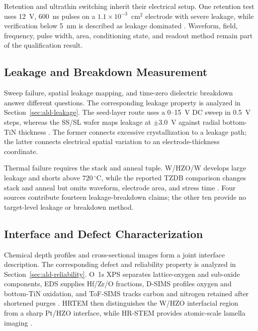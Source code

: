 \documentclass[11pt,a4paper]{report}
\begin{document}
Retention and ultrathin switching inherit their electrical setup. One retention test uses 12~V, 600~ns pulses on a $1.1\times10^{-3}$~cm$^2$ electrode with severe leakage, while verification below 5~nm is described as leakage dominated \cite{zhang2015inductive,mikolajick2018mrs}. Waveform, field, frequency, pulse width, area, conditioning state, and readout method remain part of the qualification result.

\subsection{Leakage and Breakdown Measurement}
\label{sec:ald-leakage-measurement}

Sweep failure, spatial leakage mapping, and time-zero dielectric breakdown answer different questions. The corresponding leakage property is analyzed in Section~\ref{sec:ald-leakage}. The seed-layer route uses a 0--15~V DC sweep in 0.5~V steps, whereas the SS/SL wafer maps leakage at $\pm3.0$~V against radial bottom-TiN thickness \cite{song2023seed,kaatranen2026unif}. The former connects excessive crystallization to a leakage path; the latter connects electrical spatial variation to an electrode-thickness coordinate.

Thermal failure requires the stack and anneal tuple. W/HZO/W develops large leakage and shorts above $720\,^{\circ}$C, while the reported TZDB comparison changes stack and anneal but omits waveform, electrode area, and stress time \cite{liu2025zrrich,kashir2021wake}. Four sources contribute fourteen leakage-breakdown claims; the other ten provide no target-level leakage or breakdown method.

\subsection{Interface and Defect Characterization}
\label{sec:ald-interface-defect-characterization}

Chemical depth profiles and cross-sectional images form a joint interface description. The corresponding defect and reliability property is analyzed in Section~\ref{sec:ald-reliability}. O~1s XPS separates lattice-oxygen and sub-oxide components, EDS supplies Hf/Zr/O fractions, D-SIMS profiles oxygen and bottom-TiN oxidation, and ToF-SIMS tracks carbon and nitrogen retained after shortened purges \cite{choi2022chamber,choi2025purge,kim2020tin}. HRTEM then distinguishes the W/HZO interfacial region from a sharp Pt/HZO interface, while HR-STEM provides atomic-scale lamella imaging \cite{liu2025zrrich,kashir2021wake}.
\end{document}
